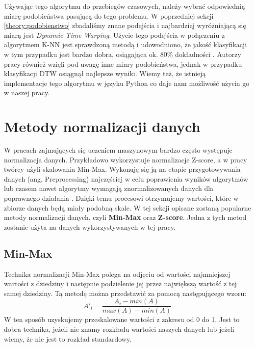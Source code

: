             Używając tego algorytmu do przebiegów czasowych, należy wybrać odpowiednią miarę podobieństwa pasującą do tego problemu. W poprzedniej sekcji \ref{theory:podobienstwo} zbadaliśmy znane podejścia i najbardziej wyróżniającą się miarą jest \textit{Dynamic Time Warping}. Użycie tego podejścia w połączeniu z algorytmem K-NN jest sprawdzoną metodą i udowodniono, że jakość klasyfikacji w tym przypadku jest bardzo dobra, osiągająca ok. 80\% dokładności \cite{KNNDTW}. Autorzy pracy również wzięli pod uwagę inne miary podobieństwa, jednak w przypadku klasyfikacji DTW osiągnął najlepsze wyniki. Wiemy też, że istnieją implementacje tego algorytmu w języku Python co daje nam możliwość użycia go w naszej pracy.
    
    \section{Metody normalizacji danych}
        \label{section:norm}
        W pracach zajmujących się uczeniem maszynowym bardzo często występuje normalizacja danych. Przykładowo \cite{RuntimeEstimationALICE} wykorzystuje normalizacje Z-score, a w pracy \cite{BigDataParallelism} twórcy użyli skalowania Min-Max. Wykonuję się ją na etapie przygotowywania danych (ang. Preprocessing) najczęściej w celu poprawienia wyników algorytmów lub czasem nawet algorytmy wymagają znormalizowanych danych dla poprawnego działania \cite{standarization_effects}. Dzięki temu procesowi otrzymujemy wartości, które w zbiorze danych będą miały podobną skale. W tej sekcji opisane zostaną popularne metody normalizacji danych, czyli \textbf{Min-Max} oraz \textbf{Z-score}. Jedna z tych metod zostanie użyta na danych wykorzystywanych w tej pracy.
        
        \subsection{Min-Max}
            Technika normalizacji Min-Max polega na odjęciu od wartości najmniejszej wartości z dziedziny i następnie podzielenie jej przez największą wartość z tej samej dziedziny. Tą metodę można przedstawić za pomocą następującego wzoru: 
            \begin{equation}
            \label{eqn:minmax}
            A'_i = \frac{A_i-min(A)}{max(A) - min(A)}
            \end{equation}
            W ten sposób uzyskujemy przeskalowane wartości z zakresu od 0 do 1. Jest to dobra technika, jeżeli nie znamy rozkładu wartości naszych danych lub jeżeli wiemy, że nie jest to rozkład standardowy.
        
